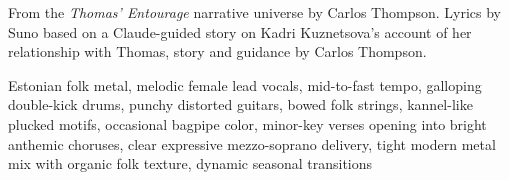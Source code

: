 
\begin{notes}
From the \emph{Thomas' Entourage} narrative universe by Carlos Thompson. Lyrics by Suno based on a Claude-guided story on Kadri Kuznetsova's account of her relationship with Thomas, story and guidance by Carlos Thompson.
\end{notes}
\begin{style}
Estonian folk metal, melodic female lead vocals, mid-to-fast tempo, galloping double-kick drums, punchy distorted guitars, bowed folk strings, kannel-like plucked motifs, occasional bagpipe color, minor-key verses opening into bright anthemic choruses, clear expressive mezzo-soprano delivery, tight modern metal mix with organic folk texture, dynamic seasonal transitions
\end{style}
